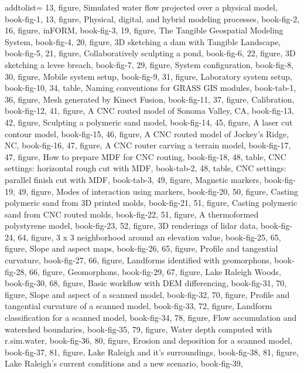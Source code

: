 \documentclass[11pt,          %
               phd,           %
               onehalfspacing %
               ]{ncsuthesis}
\begin{document}
addtolist={
	13, figure, {Simulated water flow projected over a physical model}, book-fig-1,
	13, figure, {Physical, digital, and hybrid modeling processes}, book-fig-2,
	16, figure, {inFORM}, book-fig-3,
	19, figure, {The Tangible Geospatial Modeling System}, book-fig-4,
	20, figure, {3D sketching a dam with Tangible Landscape}, book-fig-5,
	21, figure, {Collaboratively sculpting a pond}, book-fig-6,
	22, figure, {3D sketching a levee breach}, book-fig-7,
	29, figure, {System configuration}, book-fig-8,
	30, figure, {Mobile system setup}, book-fig-9,
	31, figure, {Laboratory system setup}, book-fig-10,
	34, table, {Naming conventions for GRASS GIS modules}, book-tab-1,
	36, figure, {Mesh generated by Kinect Fusion}, book-fig-11,
	37, figure, {Calibration}, book-fig-12,
	41, figure, {A CNC routed model of Sonoma Valley, CA}, book-fig-13,
	42, figure, {Sculpting a polymeric sand model}, book-fig-14,
	45, figure, {A laser cut contour model}, book-fig-15,
	46, figure, {A CNC routed model of Jockey's Ridge, NC}, book-fig-16,
	47, figure, {A CNC router carving a terrain model}, book-fig-17,
	47, figure, {How to prepare MDF for CNC routing}, book-fig-18,
	48, table, {CNC settings: horizontal rough cut with MDF}, book-tab-2,
	48, table, {CNC settings: parallel finish cut with MDF}, book-tab-3,
	49, figure, {Magnetic markers}, book-fig-19,
	49, figure, {Modes of interaction using markers}, book-fig-20,
	50, figure, {Casting polymeric sand from 3D printed molds}, book-fig-21,
	51, figure, {Casting polymeric sand from CNC routed molds}, book-fig-22,
	51, figure, {A thermoformed polystyrene model}, book-fig-23,
	52, figure, {3D renderings of lidar data}, book-fig-24,
	64, figure, {3 x 3 neighborhood around an elevation value}, book-fig-25,
	65, figure, {Slope and aspect maps}, book-fig-26,
	65, figure, {Profile and tangential curvature}, book-fig-27,
	66, figure, {Landforms identified with geomorphons}, book-fig-28,
	66, figure, {Geomorphons}, book-fig-29,
	67, figure, {Lake Raleigh Woods}, book-fig-30,
	68, figure, {Basic workflow with DEM differencing}, book-fig-31,
	70, figure, {Slope and aspect of a scanned model}, book-fig-32,
	70, figure, {Profile and tangential curvature of a scanned model}, book-fig-33,
	72, figure, {Landform classification for a scanned model}, book-fig-34,
	78, figure, {Flow accumulation and watershed boundaries}, book-fig-35,
	79, figure, {Water depth computed with r.sim.water}, book-fig-36,
	80, figure, {Erosion and deposition for a scanned model}, book-fig-37,
	81, figure, {Lake Raleigh and it's surroundings}, book-fig-38,
	81, figure, {Lake Raleigh's current conditions and a new scenario}, book-fig-39,
}
\end{document}
